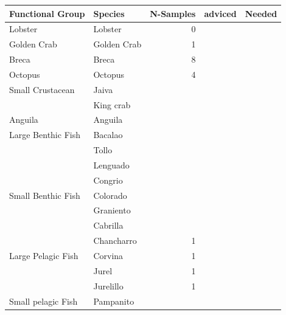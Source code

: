 \documentclass[11pt]{article}
\begin{document}
\begin{center}
\begin{tabular}{llrll}
 Functional Group    &  Species               &  N-Samples  &  adviced  &  Needed  \\
\hline
 Lobster             &  Lobster               &          0  &           &          \\
\hline
 Golden Crab         &  Golden Crab           &          1  &           &          \\
\hline
 Breca               &  Breca                 &          8  &           &          \\
\hline
 Octopus             &  Octopus               &          4  &           &          \\
\hline
 Small Crustacean    &  Jaiva                 &             &           &          \\
                     &  King crab             &             &           &          \\
\hline
 Anguila             &  Anguila               &             &           &          \\
\hline
 Large Benthic Fish  &  Bacalao               &             &           &          \\
                     &  Tollo                 &             &           &          \\
                     &  Lenguado              &             &           &          \\
                     &  Congrio               &             &           &          \\
\hline
 Small Benthic Fish  &  Colorado              &             &           &          \\
                     &  Graniento             &             &           &          \\
                     &  Cabrilla              &             &           &          \\
                     &  Chancharro            &          1  &           &          \\
\hline
 Large Pelagic Fish  &  Corvina               &          1  &           &          \\
                     &  Jurel                 &          1  &           &          \\
                     &  Jurelillo             &          1  &           &          \\
\hline
 Small pelagic Fish  &  Pampanito             &             &           &          \\

\end{tabular}
\end{center}
\end{document}
